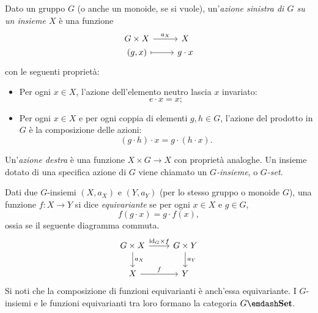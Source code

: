 \begin{example}\label{ex_cat_g_insiemi}
	Dato un gruppo \(G\) (o anche un monoide, se si vuole), un'\emph{azione sinistra di \(G\) su un insieme \(X\)} è una funzione
	\[
		\begin{tikzcd}[row sep=0]
			G\times X \ar{r}{a_X} & X \\
			(g,x) \ar[mapsto]{r} & g\cdot x
		\end{tikzcd}
	\]
	con le seguenti proprietà:
	\begin{itemize}
		\item Per ogni \(x\in X\), l'azione dell'elemento neutro lascia \(x\) invariato:
		      \[
			      e\cdot x = x ;
		      \]
		\item Per ogni \(x\in X\) e per ogni coppia di elementi \(g,h\in G\), l'azione del prodotto in \(G\) è la composizione delle azioni:
		      \[
			      (g\cdot h)\cdot x = g\cdot(h\cdot x) .
		      \]
	\end{itemize}
	Un'\emph{azione destra} è una funzione \(X\times G\to X\) con proprietà analoghe.
	Un insieme dotato di una specifica azione di \(G\) viene chiamato un \emph{\(G\)-insieme}, o \emph{\(G\)-set}.

	Dati due \(G\)-insiemi \((X,a_X)\) e \((Y,a_Y)\) (per lo stesso gruppo o monoide \(G\)), una funzione \(f:X\to Y\) si dice \emph{equivariante} se per ogni \(x\in X\) e \(g\in G\),
	\[
		f(g\cdot x) = g\cdot f(x) ,
	\]
	ossia se il seguente diagramma commuta.
	\[
		\begin{tikzcd}
			G\times X \ar{r}{\id_G\times f} \ar{d}{a_X} & G\times Y \ar{d}{a_Y} \\
			X \ar{r}{f} & Y
		\end{tikzcd}
	\]
	Si noti che la composizione di funzioni equivarianti è anch'essa equivariante. I \(G\)-insiemi e le funzioni equivarianti tra loro formano la categoria \(G\emdash\ctSet\).
\end{example}
